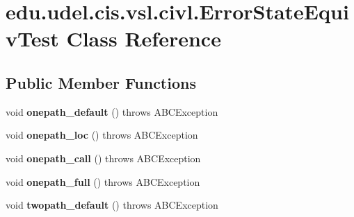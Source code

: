 \hypertarget{classedu_1_1udel_1_1cis_1_1vsl_1_1civl_1_1ErrorStateEquivTest}{}\section{edu.\+udel.\+cis.\+vsl.\+civl.\+Error\+State\+Equiv\+Test Class Reference}
\label{classedu_1_1udel_1_1cis_1_1vsl_1_1civl_1_1ErrorStateEquivTest}
\subsection*{Public Member Functions}
\begin{DoxyCompactItemize}
\item 
\hypertarget{classedu_1_1udel_1_1cis_1_1vsl_1_1civl_1_1ErrorStateEquivTest_acab0d4a7f2fd992d630d4caf5551ba54}{}void {\bfseries onepath\+\_\+default} ()  throws A\+B\+C\+Exception \label{classedu_1_1udel_1_1cis_1_1vsl_1_1civl_1_1ErrorStateEquivTest_acab0d4a7f2fd992d630d4caf5551ba54}

\item 
\hypertarget{classedu_1_1udel_1_1cis_1_1vsl_1_1civl_1_1ErrorStateEquivTest_a0739e36b077054d48c25da366e2ec1f7}{}void {\bfseries onepath\+\_\+loc} ()  throws A\+B\+C\+Exception \label{classedu_1_1udel_1_1cis_1_1vsl_1_1civl_1_1ErrorStateEquivTest_a0739e36b077054d48c25da366e2ec1f7}

\item 
\hypertarget{classedu_1_1udel_1_1cis_1_1vsl_1_1civl_1_1ErrorStateEquivTest_a071c509ec89d1cd8513c08d33fd49f5b}{}void {\bfseries onepath\+\_\+call} ()  throws A\+B\+C\+Exception \label{classedu_1_1udel_1_1cis_1_1vsl_1_1civl_1_1ErrorStateEquivTest_a071c509ec89d1cd8513c08d33fd49f5b}

\item 
\hypertarget{classedu_1_1udel_1_1cis_1_1vsl_1_1civl_1_1ErrorStateEquivTest_a7216b34041609d64e3cf4928acb2aba0}{}void {\bfseries onepath\+\_\+full} ()  throws A\+B\+C\+Exception \label{classedu_1_1udel_1_1cis_1_1vsl_1_1civl_1_1ErrorStateEquivTest_a7216b34041609d64e3cf4928acb2aba0}

\item 
\hypertarget{classedu_1_1udel_1_1cis_1_1vsl_1_1civl_1_1ErrorStateEquivTest_ad2f87774f6d7ed2f70986b011c1f8cd3}{}void {\bfseries twopath\+\_\+default} ()  throws A\+B\+C\+Exception \label{classedu_1_1udel_1_1cis_1_1vsl_1_1civl_1_1ErrorStateEquivTest_ad2f87774f6d7ed2f70986b011c1f8cd3}


\end{DoxyCompactItemize}

